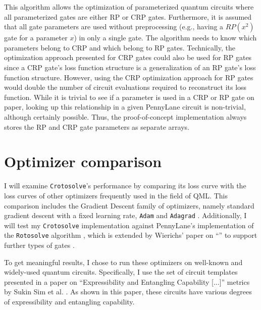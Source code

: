 This algorithm allows the optimization of parameterized quantum circuits where
all parameterized gates are either RP or CRP gates.
Furthermore, it is assumed that all gate parameters are used without
preprocessing (e.g., having a $RP(x^2)$ gate for a parameter $x$) in only a
single gate.
The algorithm needs to know which parameters belong to CRP and which belong to
RP gates.
Technically, the optimization approach presented for CRP gates could also be
used for RP gates since a CRP gate's loss function structure is a generalization
of an RP gate's loss function structure.
However, using the CRP optimization approach for RP gates would double the
number of circuit evaluations required to reconstruct its loss function.
While it is trivial to see if a parameter is used in a CRP or RP gate on paper,
looking up this relationship in a given PennyLane circuit is non-trivial,
although certainly possible.
Thus, the proof-of-concept implementation always stores the RP and CRP gate
parameters as separate arrays.

\section{Optimizer comparison}
\label{sec:optimizer-comparison}

I will examine \texttt{Crotosolve}'s performance by comparing its loss curve
with the loss curves of other optimizers frequently used in the field of QML.
This comparison includes the Gradient Descent family of optimizers, namely
standard gradient descent with a fixed learning rate, %
\texttt{Adam} \cite{kingma_adam_2017} and
\texttt{Adagrad} \cite{duchi_adaptive_2011}.
Additionally, I will test my \texttt{Crotosolve} implementation against
PennyLane's implementation of the \texttt{Rotosolve} algorithm
\cite{ostaszewski_structure_2021,bergholm_pennylane_2022}, which is extended by
Wierichs' paper on ``\emph{}'' to
support further types of gates \cite{wierichs_general_2022}.

To get meaningful results, I chose to run these optimizers on well-known and
widely-used quantum circuits.
Specifically, I use the set of circuit templates presented in a paper on
``Expressibility and Entangling Capability [...]'' metrics by Sukin Sim et al.
\cite{sim_expressibility_2019}.
As shown in this paper, these circuits have various degrees of expressibility
and entangling capability. %


